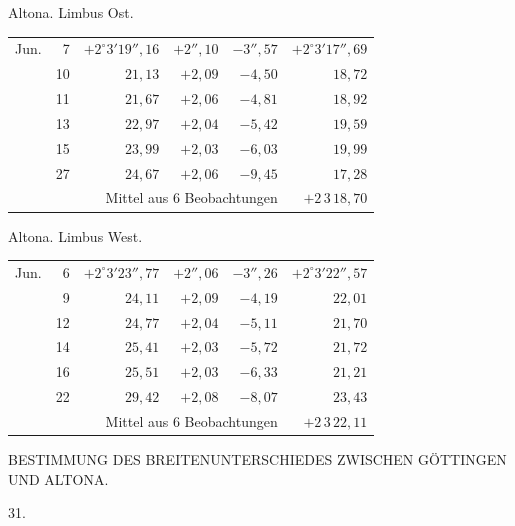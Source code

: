 \noindent\begin{minipage}[t]{.495\textwidth}\centering Altona. Limbus Ost.\par\smallskip
{\scriptsize\setlength{\tabcolsep}{1pt}\renewcommand{\arraystretch}{1.2}\begin{tabular}{lr|r|r|r|r|}
Jun.&7&$+2^\circ3'19''{,}16$&$+2''{,}10$&$-3''{,}57$&$+2^\circ3'17''{,}69$\\
&10&$21{,}13$&$+2{,}09$&$-4{,}50$&$18{,}72$\\
&11&$21{,}67$&$+2{,}06$&$-4{,}81$&$18{,}92$\\
&13&$22{,}97$&$+2{,}04$&$-5{,}42$&$19{,}59$\\
&15&$23{,}99$&$+2{,}03$&$-6{,}03$&$19{,}99$\\
&27&$24{,}67$&$+2{,}06$&$-9{,}45$&$17{,}28$\\
\cline{6-6}\multicolumn{5}{r}{Mittel aus 6 Beobachtungen}&$+2\,3\,18{,}70$
\end{tabular}}\end{minipage}\hfill\begin{minipage}[t]{.495\textwidth}\centering Altona. Limbus West.\par\smallskip
{\scriptsize\setlength{\tabcolsep}{1pt}\renewcommand{\arraystretch}{1.2}\begin{tabular}{lr|r|r|r|r}
Jun.&6&$+2^\circ3'23''{,}77$&$+2''{,}06$&$-3''{,}26$&$+2^\circ3'22''{,}57$\\
&9&$24{,}11$&$+2{,}09$&$-4{,}19$&$22{,}01$\\
&12&$24{,}77$&$+2{,}04$&$-5{,}11$&$21{,}70$\\
&14&$25{,}41$&$+2{,}03$&$-5{,}72$&$21{,}72$\\
&16&$25{,}51$&$+2{,}03$&$-6{,}33$&$21{,}21$\\
&22&$29{,}42$&$+2{,}08$&$-8{,}07$&$23{,}43$\\
\cline{6-6}\multicolumn{5}{r}{Mittel aus 6 Beobachtungen}&$+2\,3\,22{,}11$
\end{tabular}}\end{minipage}
\par\vspace{4mm}

\clearpage
\noindent{}\parbox[t]{\dimexpr\textwidth-10mm\relax}{\centering\scriptsize BESTIMMUNG DES BREITENUNTERSCHIEDES ZWISCHEN GÖTTINGEN UND ALTONA.}\par
\begin{center}31.\end{center}

